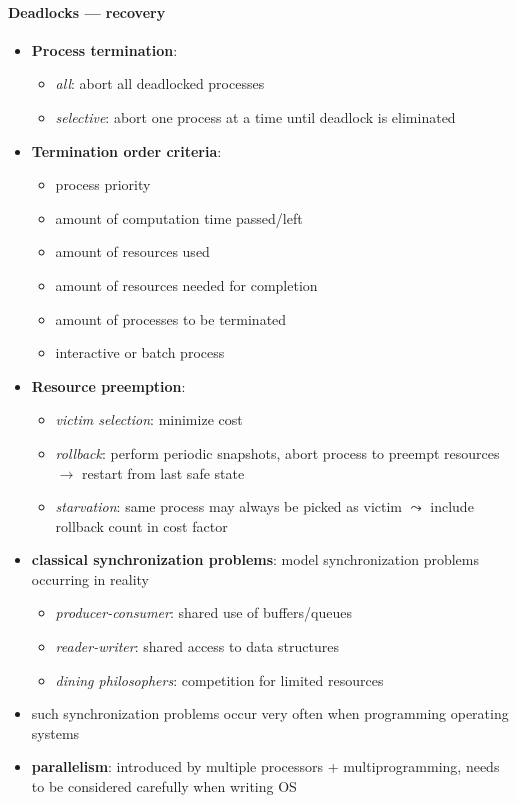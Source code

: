 \paragraph{Deadlocks --- recovery}
\begin{itemize}
  \item \textbf{Process termination}:
  \begin{itemize}
    \item \emph{all}: abort all deadlocked processes
    \item \emph{selective}: abort one process at a time until deadlock is eliminated
  \end{itemize}
  \item \textbf{Termination order criteria}:
  \begin{itemize}
    \item process priority
    \item amount of computation time passed/left
    \item amount of resources used
    \item amount of resources needed for completion
    \item amount of processes to be terminated
    \item interactive or batch process
  \end{itemize}
  \item \textbf{Resource preemption}:
  \begin{itemize}
    \item \emph{victim selection}: minimize cost
    \item \emph{rollback}: perform periodic snapshots, abort process to preempt resources $ \to $ restart from last safe state
    \item \emph{starvation}: same process may always be picked as victim $ \leadsto $ include rollback count in cost factor
  \end{itemize}
\end{itemize}

\begin{summary}
  \begin{itemize}
    \item \textbf{classical synchronization problems}: model synchronization problems occurring in reality
    \begin{itemize}
      \item \emph{producer-consumer}: shared use of buffers/queues
      \item \emph{reader-writer}: shared access to data structures
      \item \emph{dining philosophers}: competition for limited resources
    \end{itemize}
    \item such synchronization problems occur very often when programming operating systems
    \item \textbf{parallelism}: introduced by multiple processors + multiprogramming, needs to be considered carefully when writing OS
  \end{itemize}
\end{summary}
